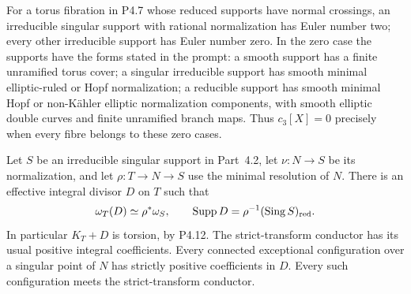 \begin{proposition}[P4.8]\hypertarget{tag-02Y0}{}\label{night:P4.8}\label{stmt:P4.8}


For a torus fibration in P4.7 whose reduced supports have normal
crossings, an irreducible singular support with
rational normalization has Euler number two; every other irreducible
support has Euler number zero. In the zero case the supports have the
forms stated in the prompt: a smooth support has a finite unramified
torus cover; a singular irreducible support has smooth minimal
elliptic-ruled or Hopf normalization; a reducible support has smooth
minimal Hopf or non-Kähler elliptic normalization components, with
smooth elliptic double curves and finite unramified branch maps.
Thus $c_3[X]=0$ precisely when every fibre belongs to these zero cases.
\end{proposition}

\begin{proposition}[P4R.6]\hypertarget{tag-02YI}{}\label{night:P4R.6}\label{stmt:P4R.6}


Let $S$ be an irreducible singular support in
Part~4.2, let $\nu:N\to S$ be its normalization,
and let $\rho:T\to N\to S$ use the minimal
resolution of $N$. There is an effective integral
divisor $D$ on $T$ such that
\[
 \omega_T(D)\simeq\rho^*\omega_S,
 \qquad \operatorname{Supp}D
       =\rho^{-1}(\operatorname{Sing}S)_{\rm red}.
\]
In particular $K_T+D$ is torsion, by P4.12.
The strict-transform conductor has its usual
positive integral coefficients. Every connected
exceptional configuration over a singular point
of $N$ has strictly positive coefficients in $D$.
Every such configuration meets the strict-transform
conductor.
\end{proposition}

